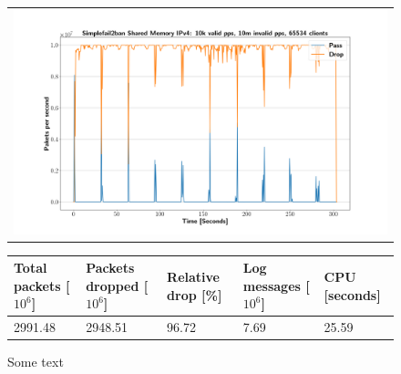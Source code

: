 \begin{figure}[p]
	\label{fig:simplefail2ban:shm:ip4:10m}
	\centering
	\scriptsize
	\begin{tabular}{c}
    	\centerline{\includegraphics[width=1.2\textwidth]{images/simplefail2ban_shm_ipv4_v10k_iv10m_c65534.png}}
	\end{tabular}
	\begin{tabular}{lllll}
		\toprule
		\textbf{Total packets [$10^6$]} & \textbf{Packets dropped [$10^6$]} & \textbf{Relative drop [\%]} & \textbf{Log messages [$10^6$]} & \textbf{CPU [seconds]} \\ \midrule 
		2991.48 & 2948.51 & 96.72 & 7.69 & 25.59 \\
		\bottomrule
	\end{tabular}
	\caption[Simplefail2ban Shared Memory IPv4 10m PPS]{Some text}
\end{figure}

